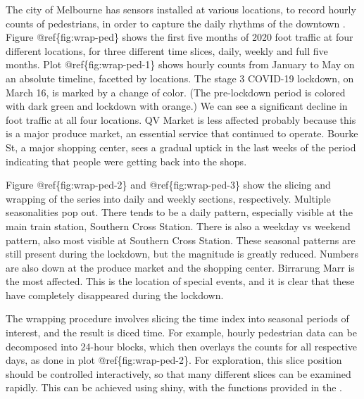 The city of Melbourne has sensors installed at various locations, to
record hourly counts of pedestrians, in order to capture the daily
rhythms of the downtown \citep{ped}. Figure @ref\{fig:wrap-ped\} shows
the first five months of 2020 foot traffic at four different locations,
for three different time slices, daily, weekly and full five months.
Plot @ref\{fig:wrap-ped-1\} shows hourly counts from January to May on
an absolute timeline, facetted by locations. The stage 3 COVID-19
lockdown, on March 16, is marked by a change of color. (The pre-lockdown
period is colored with dark green and lockdown with orange.) We can see
a significant decline in foot traffic at all four locations. QV Market
is less affected probably because this is a major produce market, an
essential service that continued to operate. Bourke St, a major shopping
center, sees a gradual uptick in the last weeks of the period indicating
that people were getting back into the shops.

Figure @ref\{fig:wrap-ped-2\} and @ref\{fig:wrap-ped-3\} show the
slicing and wrapping of the series into daily and weekly sections,
respectively. Multiple seasonalities pop out. There tends to be a daily
pattern, especially visible at the main train station, Southern Cross
Station. There is also a weekday vs weekend pattern, also most visible
at Southern Cross Station. These seasonal patterns are still present
during the lockdown, but the magnitude is greatly reduced. Numbers are
also down at the produce market and the shopping center. Birrarung Marr
is the most affected. This is the location of special events, and it is
clear that these have completely disappeared during the lockdown.

The wrapping procedure involves slicing the time index into seasonal
periods of interest, and the result is diced time. For example, hourly
pedestrian data can be decomposed into 24-hour blocks, which then
overlays the counts for all respective days, as done in plot
@ref\{fig:wrap-ped-2\}. For exploration, this slice position should be
controlled interactively, so that many different slices can be examined
rapidly. This can be achieved using shiny, with the functions provided
in the .

